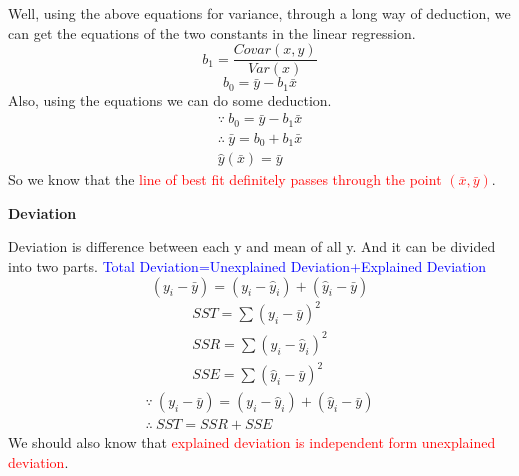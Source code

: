 Well, using the above equations for variance, through a long way of deduction, we can get the equations of the two constants in the linear regression.
\begin{equation}
    b_1=\frac{Covar(x,y)}{Var(x)}
\end{equation}
\begin{equation}
    b_0=\bar{y}-b_1\bar{x}
\end{equation}
Also, using the equations we can do some deduction.
\begin{align}
    \because  \ b_0=\bar{y}-b_1\bar{x}\\
    \therefore  \ \bar{y}=b_0+b_1\bar{x}\\
    \hat{y}(\bar{x})=\bar{y}
\end{align}
So we know that the \textcolor{red}{line of best fit definitely passes through the point \((\bar{x},\bar{y})\)}.
 \vspace{6ex}
\begin{Center}
    \textbf{Deviation}
\end{Center}
Deviation is difference between each y and mean of all y. And it can be divided into two parts. \textcolor{blue}{Total Deviation=Unexplained Deviation+Explained Deviation}
\begin{equation}
    (y_i-\bar{y})=(y_i-\hat{y}_i)+(\hat{y}_i-\bar{y})
\end{equation}
\begin{align}
    SST=\sum{(y_i-\bar{y})^2}\\
    SSR=\sum{(y_i-\hat{y}_i)^2}\\
    SSE=\sum{(\hat{y}_i-\bar{y})^2}
\end{align}
\begin{align}
    \because \ (y_i-\bar{y})=(y_i-\hat{y}_i)+(\hat{y}_i-\bar{y})\\
    \therefore \ SST=SSR+SSE
\end{align}
We should also know that \textcolor{red}{explained deviation is independent form unexplained deviation}.

